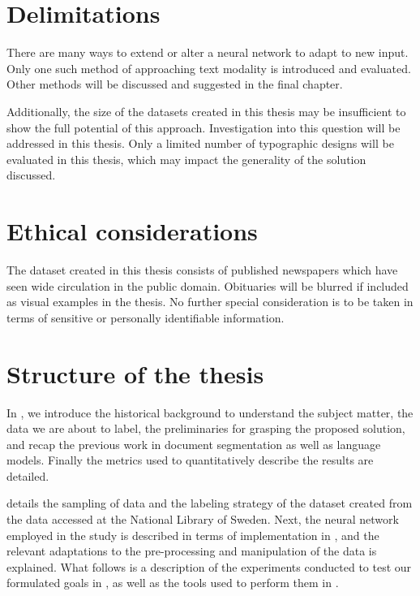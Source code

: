 \documentclass[oneside, english, bibtex]{kththesis}
\begin{document}
\section{Delimitations}

There are many ways to extend or alter a neural network to adapt to new input. Only one such method of approaching text modality is introduced and evaluated. Other methods will be discussed and suggested in the final chapter.

Additionally, the size of the datasets created in this thesis may be insufficient to show the full potential of this approach.
Investigation into this question will be addressed in this thesis.
Only a limited number of typographic designs will be evaluated in this thesis, which may impact the generality of the solution discussed.

\section{Ethical considerations}

The dataset created in this thesis consists of published newspapers which have seen wide circulation in the public domain. 
Obituaries will be blurred if included as visual examples in the thesis. No further special consideration is to be taken in terms of sensitive or personally identifiable information.

\section{Structure of the thesis}

In , we introduce the historical background to understand the subject matter, the data we are about to label, the preliminaries for grasping the proposed solution, and recap the previous work in document segmentation as well as language models.
Finally the metrics used to quantitatively describe the results are detailed.

 details the sampling of data and the labeling strategy of the dataset created from the data accessed at the National Library of Sweden.
Next, the neural network employed in the study is described in terms of implementation in , and the relevant adaptations to the pre-processing and manipulation of the data is explained.
What follows is a description of the experiments conducted to test our formulated goals in , as well as the tools used to perform them in .
\end{document}
